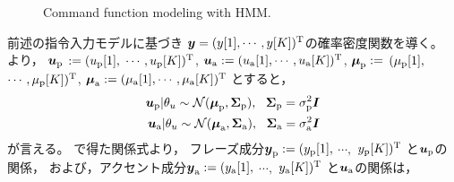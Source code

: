 \begin{figure}[t]
\centering
\vspace{-1ex}
 \caption{Command function modeling with HMM.}
\label{fig:command_model}
\vspace{-3ex}
\end{figure}




前述の指令入力モデルに基づき
$\Vec{y}=({y}[1],\cdots,y[K])^{\rm T}$の確率密度関数を導く。
より，
$\Vec{u}_{\rm p}$ $:=({u}_{\rm p}[1],$ $\cdots,{u}_{\rm p}[K])^{\rm T}$\!, 
$\Vec{u}_{\rm a}:=({u}_{\rm a}[1],\cdots,{u}_{\rm a}[K])^{\rm T}$\!, 
$\Vec{\mu}_{\rm p}:=$ $({\mu}_{\rm p}[1],$ $\cdots,{\mu}_{\rm p}[K])^{\rm T}$\!, 
$\Vec{\mu}_{\rm a}:=({\mu}_{\rm a}[1],\cdots,{\mu}_{\rm a}[K])^{\rm T}$\!
とすると，
\begin{align}
\Vec{u}_{\rm p}|\theta_u\sim
\mathcal{N}(
\Vec{\mu}_{\rm p},
\Mat{\Sigma}_{\rm p}
),~~\Mat{\Sigma}_{\rm p}=\sigma_{\rm p}^2\Mat{I}
\label{eq:u_p_dist}
\\
\Vec{u}_{\rm a}|\theta_u\sim
\mathcal{N}(
\Vec{\mu}_{\rm a},
\Mat{\Sigma}_{\rm a}
),~~\Mat{\Sigma}_{\rm a}=\sigma_{\rm a}^2\Mat{I}
\label{eq:u_a_dist}
\end{align}
が言える。
で得た関係式より，
フレーズ成分$\Vec{y}_{\rm p}:=(y_{\rm p}[1],$ $\cdots,$ $y_{\rm p}[K])^{\rm T}$
と$\Vec{u}_{\rm p}$の関係，
および，アクセント成分$\Vec{y}_{\rm a}:=(y_{\rm a}[1],$ $\cdots,$ $y_{\rm a}[K])^{\rm T}$
と$\Vec{u}_{\rm a}$の関係は，
